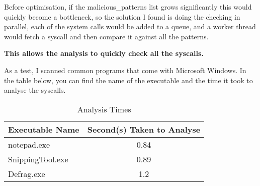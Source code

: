 Before optimisation, if the malicious\_patterns list grows
significantly this would quickly become a bottleneck,
so the solution I found is doing the checking in parallel,
each of the system calls would be added to a queue,
and a worker thread would fetch a syscall
and then compare it against all the patterns.

\textbf{This allows the analysis to quickly check all the syscalls.}

As a test, I scanned common programs that come with Microsoft Windows.
In the table below, you can find the name of the executable
and the time it took to analyse the syscalls.

\begin{table}[ht]
    \begin{tabular}{|l|c|}
        \hline
        Executable Name & Second(s) Taken to Analyse \\
        \hline
        notepad.exe & 0.84 \\
        \hline
        SnippingTool.exe & 0.89 \\
        \hline
        Defrag.exe & 1.2 \\
        \hline
    \end{tabular}
    \caption{Analysis Times}
    \label{table:analysisTimes}
\end{table}
